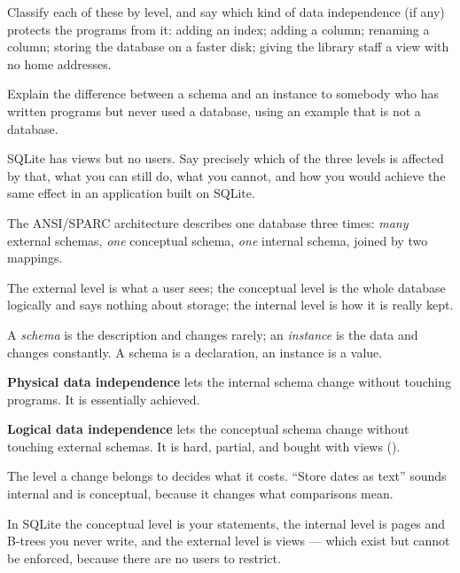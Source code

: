 \begin{checkpoint}
\begin{tightnum}
  \item Classify each of these by level, and say which kind of data
        independence (if any) protects the programs from it: adding an index;
        adding a column; renaming a column; storing the database on a faster
        disk; giving the library staff a view with no home addresses.
  \item Explain the difference between a schema and an instance to somebody who
        has written programs but never used a database, using an example that
        is not a database.
  \item SQLite has views but no users. Say precisely which of the three levels
        is affected by that, what you can still do, what you cannot, and how
        you would achieve the same effect in an application built on SQLite.
\end{tightnum}
\end{checkpoint}

\begin{chaptersummary}
\begin{tight}
  \item The ANSI/SPARC architecture describes one database three times:
        \emph{many} external schemas, \emph{one} conceptual schema, \emph{one}
        internal schema, joined by two mappings.
  \item The external level is what a user sees; the conceptual level is the
        whole database logically and says nothing about storage; the internal
        level is how it is really kept.
  \item A \emph{schema} is the description and changes rarely; an
        \emph{instance} is the data and changes constantly. A schema is a
        declaration, an instance is a value.
  \item \textbf{Physical data independence} lets the internal schema change
        without touching programs. It is essentially achieved.
  \item \textbf{Logical data independence} lets the conceptual schema change
        without touching external schemas. It is hard, partial, and bought
        with views ().
  \item The level a change belongs to decides what it costs. ``Store dates as
        text'' sounds internal and is conceptual, because it changes what
        comparisons mean.
  \item In SQLite the conceptual level is your 
        statements, the internal level is pages and B-trees you never write,
        and the external level is views --- which exist but cannot be
        enforced, because there are no users to restrict.
\end{tight}
\end{chaptersummary}

